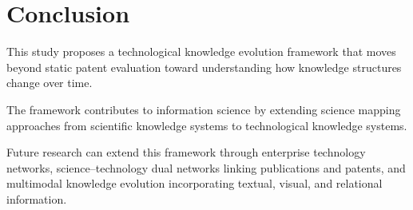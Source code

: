 
\section{Conclusion}

This study proposes a technological knowledge evolution framework that moves beyond static patent evaluation toward understanding how knowledge structures change over time.

The framework contributes to information science by extending science mapping approaches from scientific knowledge systems to technological knowledge systems.

Future research can extend this framework through enterprise technology networks, science--technology dual networks linking publications and patents, and multimodal knowledge evolution incorporating textual, visual, and relational information.
